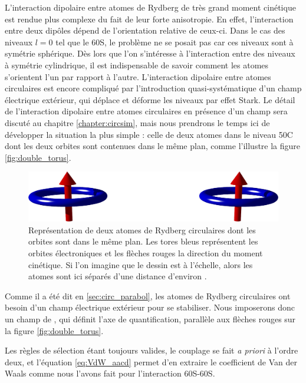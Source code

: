 \noindent L'interaction dipolaire entre atomes de Rydberg de très grand moment cinétique est rendue plus complexe du fait de leur forte anisotropie.
En effet, l'interaction entre deux dipôles dépend de l'orientation relative de ceux-ci.
Dans le cas des niveaux $l=0$ tel que le 60S, le problème ne se posait pas car ces niveaux sont à symétrie sphérique.
Dès lors que l'on s'intéresse à l'interaction entre des niveaux à symétrie cylindrique, il est indispensable de savoir comment les atomes s'orientent l'un par rapport à l'autre.
L'interaction dipolaire entre atomes circulaires est encore compliqué par l'introduction quasi-systématique d'un champ électrique extérieur, qui déplace et déforme les niveaux par effet Stark.
Le détail de l'interaction dipolaire entre atomes circulaires en présence d'un champ sera discuté au chapitre \ref{chapter:circsim}, mais nous prendrons le temps ici de développer la situation la plus simple :
celle de deux atomes dans le niveau 50C dont les deux orbites sont contenues dans le même plan, comme l'illustre la figure \eqref{fig:double_torus}.
%
\begin{figure}[!h]
\centering
\includegraphics[width=.8\linewidth]{figures/double_torus.png}
\caption[Deux atomes circulaires côte à côte]{Représentation de deux atomes de Rydberg circulaires dont les orbites sont dans le même plan.
Les tores bleus représentent les orbites électroniques et les flèches rouges la direction du moment cinétique.
Si l'on imagine que le dessin est à l'échelle, alors les atomes sont ici séparés d'une distance d'environ .}
\label{fig:double_torus}
\end{figure}
%
Comme il a été dit en \ref{sec:circ_parabol}, les atomes de Rydberg circulaires ont besoin d'un champ électrique extérieur pour se stabiliser.
Nous imposerons donc un champ de , qui définit l'axe de quantification, parallèle aux flèches rouges sur la figure \eqref{fig:double_torus}.

Les règles de sélection étant toujours valides, le couplage se fait \textit{a priori} à l'ordre deux, et l'équation \eqref{eq:VdW_aacd} permet d'en extraire le coefficient de Van der Waals comme nous l'avons fait pour l'interaction 60S-60S.

